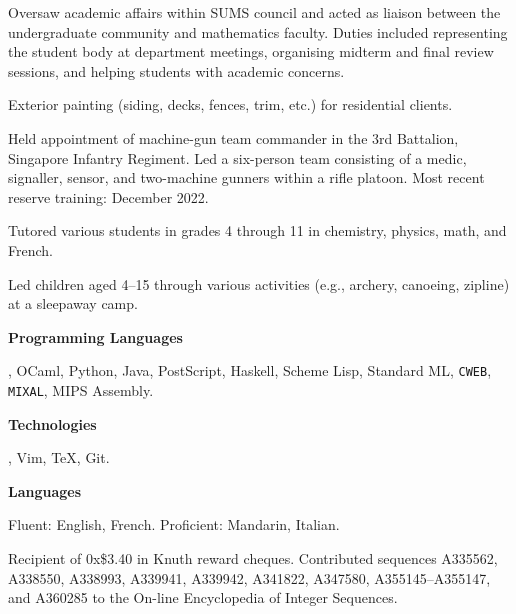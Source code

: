 \smallskip
Oversaw academic affairs within {\mc SUMS} council and acted as liaison between the undergraduate community and
mathematics faculty. Duties included representing the student body at department meetings,
organising midterm and final review sessions,
and helping students with
academic concerns.
\medbreak

\smallskip
Exterior painting (siding, decks, fences, trim, etc.) for residential clients.
\medbreak

\smallskip
Held appointment of machine-gun team commander in the 3rd Battalion, Singapore Infantry Regiment.
Led a six-person team consisting of a medic, signaller, sensor, and two-machine gunners within a rifle platoon.
Most recent reserve training: December 2022.
\medbreak

\smallskip
Tutored various students in grades 4 through 11 in chemistry, physics, math, and French.
\medbreak

\smallskip
Led children aged 4--15 through various activities (e.g., archery, canoeing, zipline) at a sleepaway camp.
\medbreak


{\bf Programming Languages}\par
\CEE, OCaml, Python, Java, PostScript, Haskell, Scheme Lisp,  Standard ML, {\tt CWEB}, {\tt MIXAL},
{\mc MIPS} Assembly.
\medbreak

{\bf Technologies}\par
\UNIX, Vim, \TeX, Git.
\medbreak

{\bf Languages}\par
Fluent: English, French. Proficient: Mandarin, Italian.
\medbreak


\parindent=10pt
\thing Recipient of 0x\$3.40 in Knuth reward cheques.
\smallskip
\thing Contributed sequences A335562, A338550, A338993, A339941, A339942, A341822, A347580,
A355145--A355147, and A360285
to the On-line Encyclopedia of Integer Sequences.
\medbreak

\filbreak

\bye

